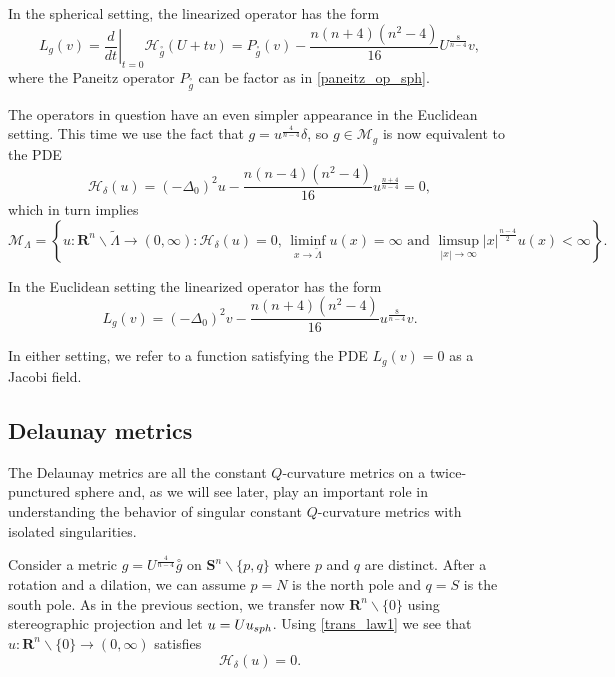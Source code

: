 \documentclass[reqno,11pt]{amsart}
\theoremstyle{tttheorem}
\newcommand{\Ss}{\mathbf{S}}
\newcommand{\R}{\mathbf{R}}
\begin{document}
In the spherical setting, the linearized operator has the 
form 
\begin{equation} \label{lin_op_spherical} 
L_g (v)  =  \left. \frac{d}{dt} \right |_{t=0} \mathcal{H}_{\overset{\circ}{g}} (U + tv) 
= P_{\overset{\circ}{g}}(v) - \frac{n(n+4)(n^2-4)}{16} U^{\frac{8}{n-4}} v,
\end{equation} 
where the Paneitz operator $P_{\overset{\circ}{g}}$ can be factor as in \eqref{paneitz_op_sph}.

The operators in question have an even simpler appearance in the Euclidean 
setting. This time we use the fact that $g = u^{\frac{4}{n-4}} \delta$, 
so $g \in \mathcal{M}_g$ is now equivalent to the PDE 
$$\mathcal{H}_\delta (u) = (-\Delta_0)^2 u - \frac{n(n-4)(n^2-4)}{16} 
u^{\frac{n+4}{n-4}}=0, $$
which in turn implies 
$$\mathcal{M}_\Lambda = \left \{ u : \R^n \backslash \widetilde \Lambda 
\rightarrow (0,\infty) : \mathcal H_\delta(u)=0, 
\, \liminf_{x \rightarrow \widetilde \Lambda} u(x) = \infty\mbox{ and } 
\limsup_{|x| \rightarrow \infty} |x|^{\frac{n-4}{2}} u(x) < \infty \right \}. $$

In the Euclidean setting the linearized operator has the form 
\begin{equation} \label{lin_op_eucl} 
L_g(v)  =  (-\Delta_0)^2 v - \frac{n(n+4)(n^2-4)}{16} u^{\frac{8}{n-4}} v. 
\end{equation} 

In either setting, we refer to a function satisfying the PDE $L_g(v) = 0$ 
as a Jacobi field. 

\subsection{Delaunay metrics}

The Delaunay metrics are all the constant $Q$-curvature metrics on a 
twice-punctured sphere and, as we will see later, play an important 
role in understanding the behavior of singular constant $Q$-curvature 
metrics with isolated singularities. 

Consider a metric $g = U^{\frac{4}{n-4}} \overset{\circ}{g}$ on
$\Ss^n \backslash \{ p,q\}$ where $p$ and $q$ are distinct. After 
a rotation and a dilation, we can assume $p = N$ is the north pole and 
$q=S$ is the south pole. As in the previous section, we transfer 
now $\R^n \backslash \{ 0 \}$ using stereographic projection and 
let $u = U u_{\rm sph}$. 
Using \eqref{trans_law1} we see that $u: \R^n \backslash \{ 0 \} \rightarrow (0,\infty)$ satisfies 
\begin{equation} \label{del_pde_eucl_coords} 
\mathcal H_\delta(u)=0.
\end{equation} 
\end{document}
